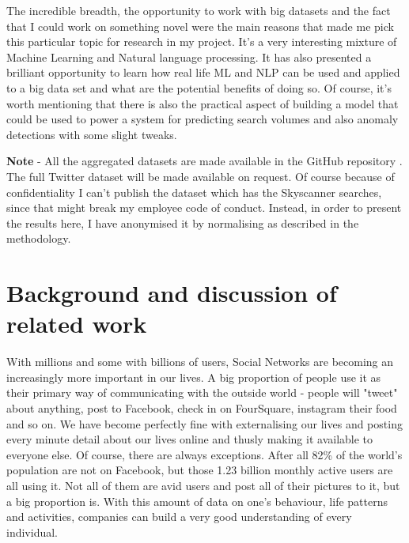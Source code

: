 \documentclass[minf,frontabs,twoside,singlespacing,parskip]{infthesis}
\begin{document}
The incredible breadth, the opportunity to work with big datasets and the fact that I could work on something novel were the main reasons that made me pick this particular topic for research in my project. It's a very interesting mixture of Machine Learning and Natural language processing. It has also presented a brilliant opportunity to learn how real life ML and NLP can be used and applied to a big data set and what are the potential benefits of doing so. Of course, it's worth mentioning that there is also the practical aspect of building a model that could be used to power a system for predicting search volumes and also anomaly detections with some slight tweaks. 


\textbf{Note} - All the aggregated datasets are made available in the GitHub repository \cite{code}.  The full Twitter dataset will be made available on request. Of course because of confidentiality I can't publish the dataset which has the Skyscanner searches, since that might break my employee code of conduct. Instead, in order to present the results here, I have anonymised it by normalising as described in the methodology. 


\section{Background and discussion of related work}


With millions and some with billions of users, Social Networks are becoming an increasingly more important in our lives. A big proportion of people use it as their primary way of communicating with the outside world - people will "tweet" about anything, post to Facebook, check in on FourSquare, instagram their food and so on. We have become perfectly fine with externalising our lives and posting every minute detail about our lives online and thusly making it available to everyone else. 
Of course, there are always exceptions. After all 82\% of the world's population are not on Facebook, but those 1.23 billion monthly active users are all using it. Not all of them are avid users and post all of their pictures to it, but a big proportion is. With this amount of data on one's behaviour, life patterns and activities, companies can build a very good understanding of every individual. 
\end{document}
